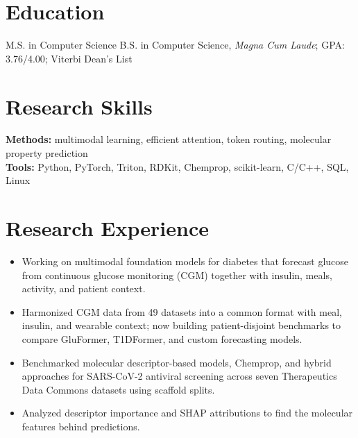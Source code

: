 \documentclass[10pt]{article}
\begin{document}
\englishheader

\section{Education}
M.S. in Computer Science
B.S. in Computer Science, \textit{Magna Cum Laude}; GPA: 3.76/4.00; Viterbi Dean's List

\section{Research Skills}
\textbf{Methods:} multimodal learning, efficient attention, token routing, molecular property prediction\\
\textbf{Tools:} Python, PyTorch, Triton, RDKit, Chemprop, scikit-learn, C/C++, SQL, Linux

\section{Research Experience}
\begin{itemize}
\item Working on multimodal foundation models for diabetes that forecast glucose from continuous glucose monitoring (CGM) together with insulin, meals, activity, and patient context.
\item Harmonized CGM data from 49 datasets into a common format with meal, insulin, and wearable context; now building patient-disjoint benchmarks to compare GluFormer, T1DFormer, and custom forecasting models.
\end{itemize}
\begin{itemize}
\item Benchmarked molecular descriptor-based models, Chemprop, and hybrid approaches for SARS-CoV-2 antiviral screening across seven Therapeutics Data Commons datasets using scaffold splits.
\item Analyzed descriptor importance and SHAP attributions to find the molecular features behind predictions.
\end{itemize}
\end{document}
